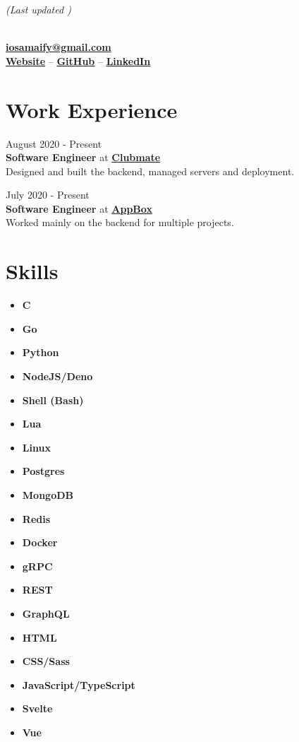 \documentclass[letterpaper, 10pt]{article}
\author{Osama Muhammad}
\date{\today}
\makeatletter
\renewcommand{\maketitle}{
	\hfill{\small\textit{(Last updated \thedate)}}
	\vspace{1em}
	\begin{center}
		\par{\huge\bfseries{\theauthor}}
		\vspace{0.7em}\\
		\href{mailto:iosamaify@gmail.com}{\textbf{iosamaify@gmail.com}}
		\vspace{0.7em}\\
		\href{https://osamai.github.io}{\textbf{Website}} --
		\href{https://github.com/osamai}{\textbf{GitHub}} --
		\href{https://www.linkedin.com/in/iosama}{\textbf{LinkedIn}}
	\end{center}
}
\newcommand{\hr}{\par{\vspace{-.3\ht\strutbox}\noindent\hrulefill\par}}
\makeatother
\begin{document}
\maketitle

\hr

\section{Work Experience}

\hfill{\footnotesize{August 2020 - Present}}\\
\textbf{Software Engineer} at \href{https://www.clubmate-sports.co.uk}{\textbf{Clubmate}}\\
\vspace{1em}
Designed and built the backend, managed servers and deployment.
\vspace{0.3cm}

\hfill{\footnotesize{July 2020 - Present}}\\
\textbf{Software Engineer} at \href{https://www.app-box.co.uk}{\textbf{AppBox}}\\
\vspace{1em}
Worked mainly on the backend for multiple projects.
\vspace{0.3cm}

\vspace{0.3cm}
\hr

\section{Skills}

\begin{multicols}{3}
	\begin{itemize}
		\item \textbf{C}
		\item \textbf{Go}
		\item \textbf{Python}
		\item \textbf{NodeJS/Deno}
		\item \textbf{Shell (Bash)}
		\item \textbf{Lua}
		\item \textbf{Linux}
		\item \textbf{Postgres}
		\item \textbf{MongoDB}
		\item \textbf{Redis}
		\item \textbf{Docker}
		\item \textbf{gRPC}
		\item \textbf{REST}
		\item \textbf{GraphQL}
		\item \textbf{HTML}
		\item \textbf{CSS/Sass}
		\item \textbf{JavaScript/TypeScript}
		\item \textbf{Svelte}
		\item \textbf{Vue}
	\end{itemize}
\end{multicols}
\end{document}
